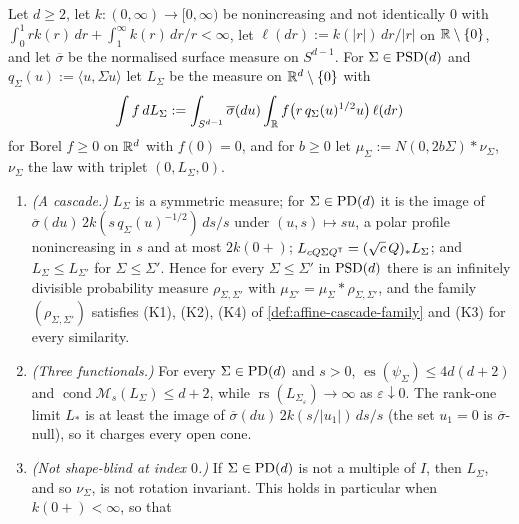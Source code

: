 \begin{proposition}
\label{prop:similarity-line-family}
\leanok
Let $d \ge 2$, let $k : (0,\infty) \to [0,\infty)$ be nonincreasing and not identically $0$ with
$\int_0^1rk(r)\,dr + \int_1^\infty k(r)\,dr/r < \infty$, let $\ell(dr) := k(|r|)\,dr/|r|$ on
$\mathbb{R} \setminus \{0\}$, and let $\overline\sigma$ be the normalised surface measure on $S^{d-1}$. For
$\Sigma \in \mathrm{PSD}(d)$ and $q_\Sigma(u) := \langle u,\Sigma u\rangle$ let $L_\Sigma$ be the measure on
$\mathbb{R}^d \setminus \{0\}$ with
\[
  \int f\,dL_\Sigma := \int_{S^{d-1}}\overline\sigma(du)\int_{\mathbb{R}}f\bigl(r\,q_\Sigma(u)^{1/2}u\bigr)\,\ell(dr)
\]
for Borel $f \ge 0$ on $\mathbb{R}^d$ with $f(0) = 0$, and for $b \ge 0$ let $\mu_\Sigma := N(0,2b\Sigma) * \nu_\Sigma$,
$\nu_\Sigma$ the law with triplet $(0, L_\Sigma, 0)$.
\begin{enumerate}
\item \emph{(A cascade.)} $L_\Sigma$ is a symmetric \Levy{} measure; for $\Sigma \in \mathrm{PD}(d)$ it is the image
of $\overline\sigma(du)\,2k(s\,q_\Sigma(u)^{-1/2})\,ds/s$ under $(u,s) \mapsto su$, a polar profile nonincreasing in
$s$ and at most $2k(0{+})$; $L_{cQ\Sigma Q^{\mathsf{T}}} = (\sqrt c\,Q)_*L_\Sigma$; and $L_\Sigma \le L_{\Sigma'}$ for
$\Sigma \le \Sigma'$. Hence for every $\Sigma \le \Sigma'$ in $\mathrm{PSD}(d)$ there is an infinitely divisible
probability measure $\rho_{\Sigma,\Sigma'}$ with $\mu_{\Sigma'} = \mu_\Sigma * \rho_{\Sigma,\Sigma'}$, and the family
$(\rho_{\Sigma,\Sigma'})$ satisfies (K1), (K2), (K4) of \ref{def:affine-cascade-family} and (K3) for every
similarity.
\item \emph{(Three functionals.)} For every $\Sigma \in \mathrm{PD}(d)$ and $s > 0$,
$\operatorname{es}(\psi_\Sigma) \le 4d(d+2)$ and $\operatorname{cond}\mathcal M_s(L_\Sigma) \le d+2$, while
$\operatorname{rs}(L_{\Sigma_\varepsilon}) \to \infty$ as $\varepsilon \downarrow 0$. The rank-one limit $L_*$ is at least the
image of $\overline\sigma(du)\,2k(s/|u_1|)\,ds/s$ (the set $u_1 = 0$ is $\overline\sigma$-null), so it
charges every open cone.
\item \emph{(Not shape-blind at index $0$.)} If $\Sigma \in \mathrm{PD}(d)$ is not a multiple of $I$, then $L_\Sigma$,
and so $\nu_\Sigma$, is not rotation invariant. This holds in particular when $k(0{+}) < \infty$, so that

\end{enumerate}
\end{proposition}
